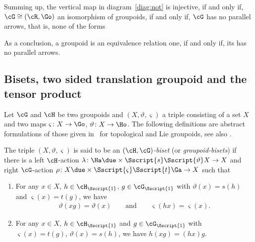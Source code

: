 \begin{Remark}
Summing up, the vertical map in diagram~\eqref{diag:not} is injective, if and only if, $\cG \cong (\cR, \Go)$ an isomorphism of groupoids, if and only if, $\cG$ has no parallel arrows, that is, none of the forms

\begin{center}
 \qquad
{}
\end{center}
As a conclusion, a groupoid is an equivalence relation one, if and only if, its has no parallel arrows.
\end{Remark}

\subsection{Bisets, two sided translation groupoid and the tensor product}\label{ssec:biset}

Let $\cG$ and $\cH$ be two groupoids and $(X, \vartheta,\varsigma)$ a triple consisting of a set $X$ and two maps $\varsigma \colon X \to \Go$, $\vartheta\colon X \to \Ho$. The following definitions are abstract formulations of those given in~\cite{Jelenc:2013, Moedijk/Mrcun:2005} for topological and Lie groupoids, see also \cite{ElKaoutit:2015, Kaoutit/Spinosa:2018}.

\begin{Definition}\label{def:biset}The triple $(X,\vartheta,\varsigma)$ is said to be an \emph{$(\cH,\cG)$-biset} (or \emph{groupoid-bisets}) if there is a left $\cH$-action $\lambda\colon \Ha \due \times {\Sscript{{s}}} { \Sscript{\vartheta}} X \to X$ and right $\cG$-action $\rho\colon X \due \times {\Sscript{\varsigma}} { \Sscript{{t}}} \Ga \to X$ such that
\begin{enumerate}\itemsep=0pt\samepage
\item For any $x \in X$, $h \in \cH_{\Sscript{1}}$, $g \in \cG_{\Sscript{1}}$ with $\vartheta(x)={s}(h)$ and $\varsigma(x)={t}(g)$, we have
\begin{gather*} \vartheta(xg) =\vartheta(x)\qquad \text{and}\qquad \varsigma(hx)=\varsigma(x).\end{gather*}
\item For any $ x \in X$, $h \in \cH_{\Sscript{1}}$ and $ g \in \cG_{\Sscript{1}}$ with $\varsigma(x)={t}(g)$, $\vartheta(x)={s}(h)$, we have $h(xg) = (hx)g$.
\end{enumerate}
\end{Definition}


